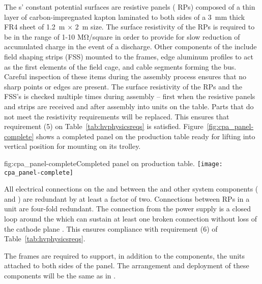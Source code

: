 The s' constant potential surfaces are resistive panels ( RPs) composed of a thin layer of carbon-impregnated kapton  laminated to both sides of a \SI{3}{\milli\meter} thick FR4 sheet of \SI{1.2}{\meter}  $\times$ \SI{2}{\meter} size.  The surface resistivity of the  RPs is required to be in the range of 1-10 M\si{\ohm}/square in order to provide for slow reduction of accumulated charge in the event of a discharge.  Other  components of the  include field shaping strips (FSS) mounted to the  frames, edge aluminum profiles to act as the first elements of the field cage, and cable segments forming the  bus. Careful inspection of these items during the assembly process ensures that no sharp points or edges are present. The surface resistivity of the  RPs and the FSS's is checked multiple times during assembly -- first when the resistive panels and strips are received and after assembly into  units on the table.  Parts that do not meet the resistivity requirements will be replaced.  This ensures that requirement (5) on Table~\ref{tab:hvphysicsreqs} is satisfied.  Figure~\ref{fig:cpa_panel-complete} shows a completed  panel on the production table ready for lifting into vertical position for mounting on its trolley.

\begin{dunefigure}{fig:cpa_panel-complete}{Completed   panel on production table.}
\texttt{[image: cpa\_panel-complete]}
\end{dunefigure}

All electrical connections on the  and between the  and other  system components ( and ) are redundant by at least a factor of two.  Connections between RPs in a unit are four-fold redundant.  The  connection from the  power supply is a closed loop around the  which can sustain at least one broken connection without loss of the cathode plane .  This ensures compliance with %
requirement (6) of Table~\ref{tab:hvphysicsreqs}.

The  frames are required to support, in addition to the  components, the  units attached to both sides of the  panel. The arrangement and deployment of these components will be the same as in .  
